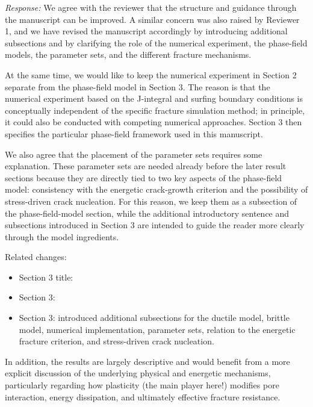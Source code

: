 \documentclass[pdflatex,sn-mathphys-num]{sn-jnl}
\begin{document}
\emph{Response:} We agree with the reviewer that the structure and guidance through the manuscript can be improved. A similar concern was also raised by Reviewer 1, and we have revised the manuscript accordingly by introducing additional subsections and by clarifying the role of the numerical experiment, the phase-field models, the parameter sets, and the different fracture mechanisms.

At the same time, we would like to keep the numerical experiment in Section 2 separate from the phase-field model in Section 3. The reason is that the numerical experiment based on the J-integral and surfing boundary conditions is conceptually independent of the specific fracture simulation method; in principle, it could also be conducted with competing numerical approaches. Section 3 then specifies the particular phase-field framework used in this manuscript.

We also agree that the placement of the parameter sets requires some explanation. These parameter sets are needed already before the later result sections because they are directly tied to two key aspects of the phase-field model: consistency with the energetic crack-growth criterion and the possibility of stress-driven crack nucleation. For this reason, we keep them as a subsection of the phase-field-model section, while the additional introductory sentence and subsections introduced in Section 3 are intended to guide the reader more clearly through the model ingredients.

Related changes:
\begin{itemize}
\item Section 3 title:  
\item Section 3: 
\item Section 3: introduced additional subsections for the ductile model, brittle model, numerical implementation, parameter sets, relation to the energetic fracture criterion, and stress-driven crack nucleation.
\end{itemize}

In addition, the results are largely descriptive and would benefit from a more explicit discussion of the underlying physical and energetic mechanisms, particularly regarding how plasticity (the main player here!) modifies pore interaction, energy dissipation, and ultimately effective fracture resistance.
\end{document}
